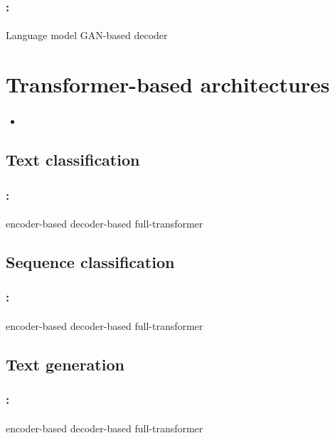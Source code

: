 \documentclass[xcolor=table]{beamer}
\begin{document}
\begin{frame}
	\frametitle{\insertshortsubtitle: \insertsection}
	\framesubtitle{\insertsubsection}
	
	Language model
	GAN-based decoder
	
	
\end{frame}


\section{Transformer-based architectures}

\begin{frame}
	\frametitle{\insertshortsubtitle}
	\framesubtitle{\insertsection}
	
	\begin{itemize}
		\item 
	\end{itemize}
	
\end{frame}

\subsection{Text classification}

\begin{frame}
	\frametitle{\insertshortsubtitle: \insertsection}
	\framesubtitle{\insertsubsection}
	
	encoder-based
	decoder-based
	full-transformer
	
\end{frame}

\subsection{Sequence classification}

\begin{frame}
	\frametitle{\insertshortsubtitle: \insertsection}
	\framesubtitle{\insertsubsection}
	
	encoder-based
	decoder-based
	full-transformer
	
\end{frame}


\subsection{Text generation}

\begin{frame}
	\frametitle{\insertshortsubtitle: \insertsection}
	\framesubtitle{\insertsubsection}
	
	encoder-based
	decoder-based
	full-transformer
	
\end{frame}



	
\end{document}
